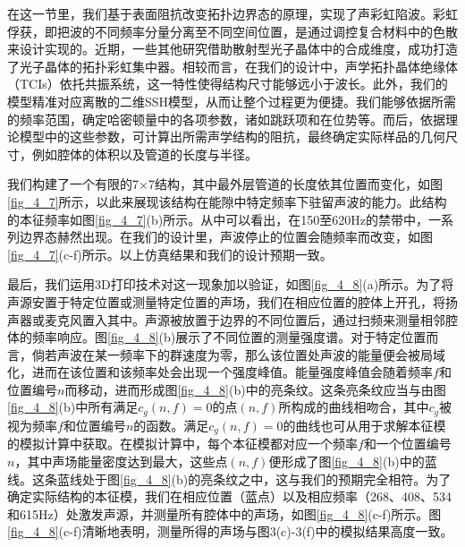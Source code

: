 在这一节里，我们基于表面阻抗改变拓扑边界态的原理，实现了声彩虹陷波。彩虹俘获，即把波的不同频率分量分离至不同空间位置，是通过调控复合材料中的色散来设计实现的。近期，一些其他研究借助散射型光子晶体中的合成维度，成功打造了光子晶体的拓扑彩虹集中器\cite{C44-3}。相较而言，在我们的设计中，声学拓扑晶体绝缘体（TCIs）依托共振系统，这一特性使得结构尺寸能够远小于波长。此外，我们的模型精准对应离散的二维SSH模型，从而让整个过程更为便捷。我们能够依据所需的频率范围，确定哈密顿量中的各项参数，诸如跳跃项和在位势等。而后，依据理论模型中的这些参数，可计算出所需声学结构的阻抗，最终确定实际样品的几何尺寸，例如腔体的体积以及管道的长度与半径。

我们构建了一个有限的7×7结构，其中最外层管道的长度依其位置而变化，如图\ref{fig_4_7}所示，以此来展现该结构在能隙中特定频率下驻留声波的能力。此结构的本征频率如图\ref{fig_4_7}(b)所示。从中可以看出，在150至620Hz的禁带中，一系列边界态赫然出现。在我们的设计里，声波停止的位置会随频率而改变，如图\ref{fig_4_7}(c-f)所示。以上仿真结果和我们的设计预期一致。

最后，我们运用3D打印技术对这一现象加以验证，如图\ref{fig_4_8}(a)所示。为了将声源安置于特定位置或测量特定位置的声场，我们在相应位置的腔体上开孔，将扬声器或麦克风置入其中。声源被放置于边界的不同位置后，通过扫频来测量相邻腔体的频率响应。图\ref{fig_4_8}(b)展示了不同位置的测量强度谱。对于特定位置而言，倘若声波在某一频率下的群速度为零，那么该位置处声波的能量便会被局域化，进而在该位置和该频率处会出现一个强度峰值。能量强度峰值会随着频率$f$和位置编号$n$而移动，进而形成图\ref{fig_4_8}(b)中的亮条纹。这条亮条纹应当与由图\ref{fig_4_8}(b)中所有满足$c_g(n,f)=0$的点$(n,f)$所构成的曲线相吻合，其中$c_g$被视为频率$f$和位置编号$n$的函数。满足$c_g(n,f)=0$的曲线也可从用于求解本征模的模拟计算中获取。在模拟计算中，每个本征模都对应一个频率$f$和一个位置编号$n$，其中声场能量密度达到最大，这些点$(n,f)$便形成了图\ref{fig_4_8}(b)中的蓝线。这条蓝线处于图\ref{fig_4_8}(b)的亮条纹之中，这与我们的预期完全相符。为了确定实际结构的本征模，我们在相应位置（蓝点）以及相应频率（268、408、534和615Hz）处激发声源，并测量所有腔体中的声场，如图\ref{fig_4_8}(c-f)所示。图\ref{fig_4_8}(c-f)清晰地表明，测量所得的声场与图3(c)-3(f)中的模拟结果高度一致。

